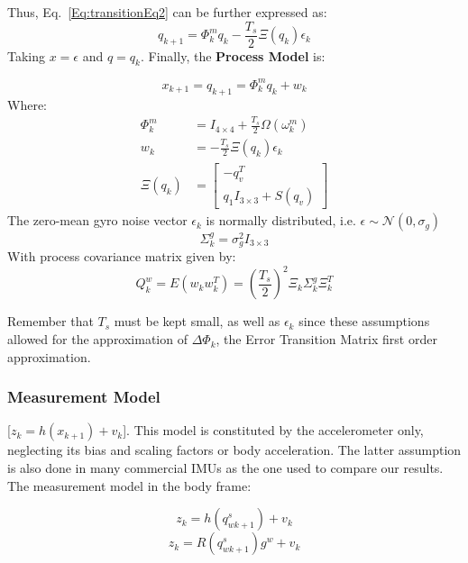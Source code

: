 \documentclass[12pt,a4paper,twoside]{article}
\begin{document}
  Thus, Eq.~\ref{Eq:transitionEq2} can be further expressed as:
  \begin{equation}
   q_{k+1} = \Phi^m_k q_k - \frac{T_s}{2} \Xi(q_k)\epsilon_k
  \end{equation}
  Taking $x = \epsilon$ and $q=q_k$.
  Finally, the \textbf{Process Model} is:
  
   \begin{equation}
    x_{k+1} = q_{k+1} = \Phi^m_k q_k + w_k
    \label{Eq:processModel}
   \end{equation}
   Where:
   \begin{align}
    \Phi^m_k &= I_{4\times4} + \frac{T_s}{2}\Omega(\omega^m_k) \\
    w_k      &= -\frac{T_s}{2}\Xi(q_k)\epsilon_k \label{Eq:noiseVecEq}\\
    \Xi(q_k) &= \left[\begin{array}{c}
                -q^T_v \\
                q_1 I_{3\times3} + S(q_v)
               \end{array}\right]
   \end{align}
   The zero-mean gyro noise vector $\epsilon_k$ is normally distributed, i.e. $\epsilon \sim \mathcal{N}(0,\sigma_g)$
   \begin{equation}
    \Sigma^{g}_k = \sigma^2_{g} I_{3\times3}
   \end{equation}
   With process covariance matrix given by:
     \begin{equation}
      Q^w_k = E(w_k w^T_k) = \left(\frac{T_s}{2}\right)^2 \Xi_k \Sigma^{g}_k \Xi^T_k
     \end{equation}

  Remember that $T_s$ must be kept small, as well as $\epsilon_k$ since these assumptions allowed for the approximation of $\Delta \Phi_k$, the Error Transition Matrix first order approximation.
  
  \subsubsection{Measurement Model}
  [$z_{k} = h(x_{k+1}) + v_{k}$]. This model is constituted by the accelerometer only, neglecting its bias and scaling factors or body acceleration. The latter assumption is also done in many commercial IMUs as the one used to compare our results. The measurement model in the body frame:

  \begin{equation}
   z_{k} = h(q^{s}_{w{k+1}}) + v_{k}
  \end{equation}
   \begin{equation}
    z_{k} = R(q^{s}_{w{k+1}}) g^{w} + v_{k}
   \end{equation}
   \label{Eq:measEq}
\end{document}
